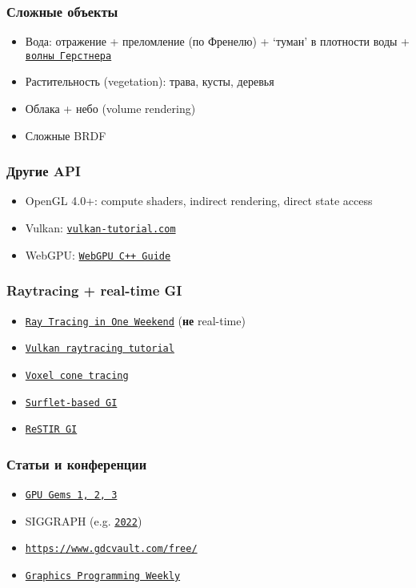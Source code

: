 \documentclass{beamer}
\begin{document}
\begin{frame}[fragile]
\frametitle{Сложные объекты}
\begin{itemize}
\item Вода: отражение + преломление (по Френелю) + `туман' в плотности воды + \href{https://en.wikipedia.org/wiki/Trochoidal_wave}{\texttt{волны Герстнера}}
\item Растительность (vegetation): трава, кусты, деревья
\item Облака + небо (volume rendering)
\item Сложные BRDF
\end{itemize}
\end{frame}

\begin{frame}[fragile]
\frametitle{Другие API}
\begin{itemize}
\item OpenGL 4.0+: compute shaders, indirect rendering, direct state access
\item Vulkan: \href{https://vulkan-tutorial.com}{\texttt{vulkan-tutorial.com}}
\item WebGPU: \href{https://eliemichel.github.io/LearnWebGPU/index.html}{\texttt{WebGPU C++ Guide}}
\end{itemize}
\end{frame}

\begin{frame}[fragile]
\frametitle{Raytracing + real-time GI}
\begin{itemize}
\item \href{https://raytracing.github.io/books/RayTracingInOneWeekend.html}{\texttt{Ray Tracing in One Weekend}} (\textbf{не} real-time)
\item \href{https://developer.nvidia.com/rtx/raytracing/vkray}{\texttt{Vulkan raytracing tutorial}}
\item \href{https://research.nvidia.com/sites/default/files/publications/GIVoxels-pg2011-authors.pdf}{\texttt{Voxel cone tracing}}
\item \href{https://www.ea.com/seed/news/siggraph21-global-illumination-surfels}{\texttt{Surflet-based GI}}
\item \href{https://research.nvidia.com/publication/2021-06_restir-gi-path-resampling-real-time-path-tracing}{\texttt{ReSTIR GI}}
\end{itemize}
\end{frame}

\begin{frame}[fragile]
\frametitle{Статьи и конференции}
\begin{itemize}
\item \href{https://developer.nvidia.com/gpugems}{\texttt{GPU Gems 1, 2, 3}}
\item SIGGRAPH (e.g. \href{https://kesen.realtimerendering.com/sig2022.html}{\texttt{2022}})
\item \href{GDC}{\texttt{https://www.gdcvault.com/free/}}
\item \href{https://www.jendrikillner.com/tags/weekly/}{\texttt{Graphics Programming Weekly}}
\end{itemize}
\end{frame}
\end{document}
